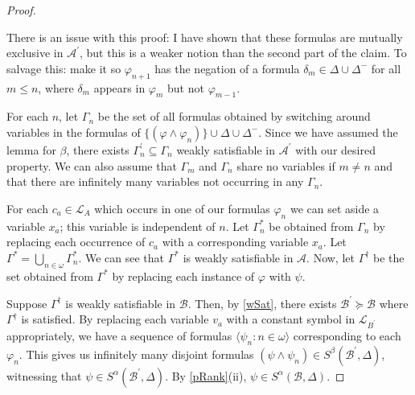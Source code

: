 \documentclass{article}
\let\mc\mathcal
\begin{document}
\begin{proof}
    \begin{mdframed}

        There is an issue with this proof: I have shown that these formulas are mutually exclusive in $\mc{A}^{\prime}$, but this is a weaker notion than the second part of the claim. To salvage this: make it so $\varphi_{n+1}$ has the negation of a formula $\delta_m \in \Delta \cup \Delta^{-}$ for all $m \leq n$, where $\delta_m$ appears in $\varphi_m$ but not $\varphi_{m-1}$.
    \end{mdframed}

    For each $n$, let $\Gamma_n$ be the set of all formulas obtained by switching around variables in the formulas of $\{ (\varphi \land \varphi_n) \} \cup \Delta \cup \Delta^{-}$. Since we have assumed the lemma for $\beta$, there exists $\Gamma_n^{\prime} \subseteq \Gamma_n$ weakly satisfiable in $\mc{A}^{\prime}$ with our desired property. We can also assume that $\Gamma_m$ and $\Gamma_n$ share no variables if $m \neq n$ and that there are infinitely many variables not occurring in any $\Gamma_n$.

    For each $c_a \in \mc{L}_A$ which occurs in one of our formulas $\varphi_n$ we can set aside a variable $x_a$; this variable is independent of $n$. Let $\Gamma_n^{\ast}$ be obtained from $\Gamma_n$ by replacing each occurrence of $c_a$ with a corresponding variable $x_a$. Let $\Gamma^{\ast} = \bigcup_{n \in \omega} \Gamma_n^{\ast}$. We can see that $\Gamma^{\ast}$ is weakly satisfiable in $\mc{A}$. Now, let $\Gamma^{\dagger}$ be the set obtained from $\Gamma^{\ast}$ by replacing each instance of $\varphi$ with $\psi$.
    
    Suppose $\Gamma^{\dagger}$ is weakly satisfiable in $\mc{B}$. Then, by \autoref{wSat}, there exists $\mc{B}^{\prime} \succeq \mc{B}$ where $\Gamma^{\dagger}$ is satisfied. By replacing each variable $v_a$ with a constant symbol in $\mc{L}_{B^{\prime}}$ appropriately, we have a sequence of formulas $\langle \psi_n : n \in \omega \rangle$ corresponding to each $\varphi_n$. This gives us infinitely many disjoint formulas $(\psi \land \psi_n) \in S^{\beta}(\mc{B}^{\prime}, \Delta)$, witnessing that $\psi \in S^{\alpha}(\mc{B}^{\prime}, \Delta)$. By \autoref{pRank}(ii), $\psi \in S^{\alpha}(\mc{B}, \Delta)$.
\end{proof}
\end{document}
